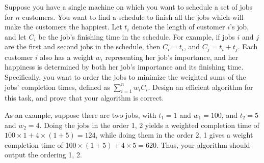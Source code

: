 \problem{}
Suppose you have a single machine on which you want to schedule a set of jobs for $n$ customers.  You want to find a schedule to finish all the jobs which will make the customers the happiest.  Let $t_i$ denote the length of customer $i$'s job, and let $C_i$ be the job's finishing time in the schedule.  For example, if jobs $i$ and $j$ are the first and second jobs in the schedule, then $C_i = t_i$, and $C_j = t_i + t_j$.  Each customer $i$ also has a weight $w_i$ representing her job's importance, and her happiness is determined by both her job's importance and its finishing time.  Specifically, you want to order the jobs to minimize the weighted sums of the jobs' completion times, defined as $\sum_{i=1}^n w_i C_i$.  Design an efficient algorithm for this task, and prove that your algorithm is correct.

As an example, suppose there are two jobs, with $t_1 = 1$ and $w_1 = 100$, and $t_2 = 5$ and $w_2 = 4$.  Doing the jobs in the order 1, 2 yields a weighted completion time of $100\times1+4\times(1+5)=124$, while doing them in the order 2, 1 gives a weight completion time of $100\times(1+5)+4\times5=620$. Thus, your algorithm should output the ordering 1, 2.

\solution{

}
\newpage
